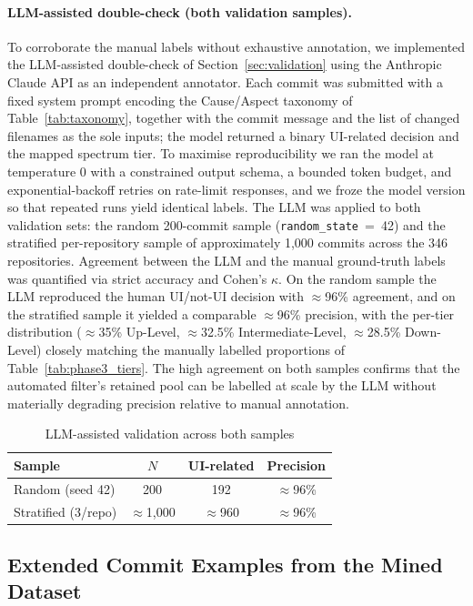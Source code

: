 \documentclass{article}
\begin{document}
\paragraph{LLM-assisted double-check (both validation samples).}
To corroborate the manual labels without exhaustive annotation, we
implemented the LLM-assisted double-check of Section~\ref{sec:validation}
using the Anthropic Claude API as an independent annotator. Each commit
was submitted with a fixed system prompt encoding the Cause/Aspect
taxonomy of Table~\ref{tab:taxonomy}, together with the commit message
and the list of changed filenames as the sole inputs; the model returned
a binary UI-related decision and the mapped spectrum tier. To maximise
reproducibility we ran the model at temperature $0$ with a constrained
output schema, a bounded token budget, and exponential-backoff retries
on rate-limit responses, and we froze the model version so that repeated
runs yield identical labels. The LLM was applied to both validation
sets: the random 200-commit sample (\texttt{random\_state}~=~42) and the
stratified per-repository sample of approximately 1,000 commits across
the 346 repositories. Agreement between the LLM and the manual
ground-truth labels was quantified via strict accuracy and Cohen's
$\kappa$. On the random sample the LLM reproduced the human UI/not-UI
decision with $\approx$96\% agreement, and on the stratified sample it
yielded a comparable $\approx$96\% precision, with the per-tier
distribution ($\approx$35\% Up-Level, $\approx$32.5\% Intermediate-Level,
$\approx$28.5\% Down-Level) closely matching the manually labelled
proportions of Table~\ref{tab:phase3_tiers}. The high agreement on both
samples confirms that the automated filter's retained pool can be
labelled at scale by the LLM without materially degrading precision
relative to manual annotation.

\begin{table}[h]\centering
\caption{LLM-assisted validation across both samples}
\label{tab:llm_validation}
\begin{tabular}{lccc}
\toprule
Sample & $N$ & UI-related & Precision \\
\midrule
Random (seed 42)      & 200   & 192   & $\approx$96\% \\
Stratified (3/repo)   & $\approx$1{,}000 & $\approx$960 & $\approx$96\% \\
\bottomrule
\end{tabular}
\end{table}

\newpage
\subsection{Extended Commit Examples from the Mined Dataset}
\label{sec:extended-examples}
\end{document}

